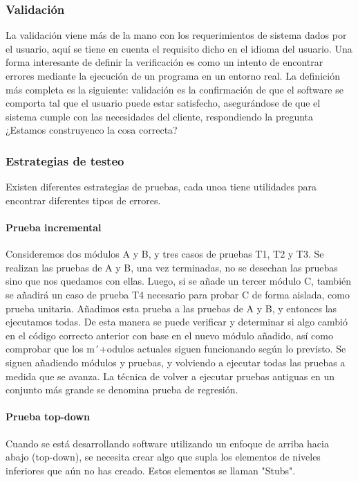 \subsubsection{Validación} La validación viene más de la mano con los requerimientos de sistema dados por el usuario, aquí se tiene en cuenta el requisito dicho en el idioma del usuario. Una forma interesante de definir la verificación es como un intento de encontrar errores mediante la ejecución de un programa en un entorno real. La definición más completa es la siguiente: validación es la confirmación de que el software se comporta tal que el usuario puede estar satisfecho, asegurándose de que el sistema cumple con las necesidades del cliente, respondiendo la pregunta ¿Estamos construyenco la cosa correcta?

\subsubsection{Estrategias de testeo} Existen diferentes estrategias de pruebas, cada unoa tiene utilidades para encontrar diferentes tipos de errores. 

\paragraph{Prueba incremental} Consideremos dos módulos A y B, y tres casos de pruebas T1, T2 y T3. Se realizan las pruebas de A y B, una vez terminadas, no se desechan las pruebas sino que nos quedamos con ellas. Luego, si se añade un tercer módulo C, también se añadirá un caso de prueba T4 necesario para probar C de forma aislada, como prueba unitaria. Añadimos esta prueba a las pruebas de A y B, y entonces las ejecutamos todas. De esta manera se puede verificar y determinar si algo cambió en el código correcto anterior con base en el nuevo módulo añadido, así como comprobar que los m´+odulos actuales siguen funcionando según lo previsto. Se siguen añadiendo módulos y pruebas, y volviendo a ejecutar todas las pruebas a medida que se avanza. La técnica de volver a ejecutar pruebas antiguas en un conjunto más grande se denomina prueba de regresión. 

\paragraph{Prueba top-down} Cuando se está desarrollando software utilizando un enfoque de arriba hacia abajo (top-down), se necesita crear algo que supla los elementos de niveles inferiores que aún no has creado. Estos elementos se llaman "Stubs". 

